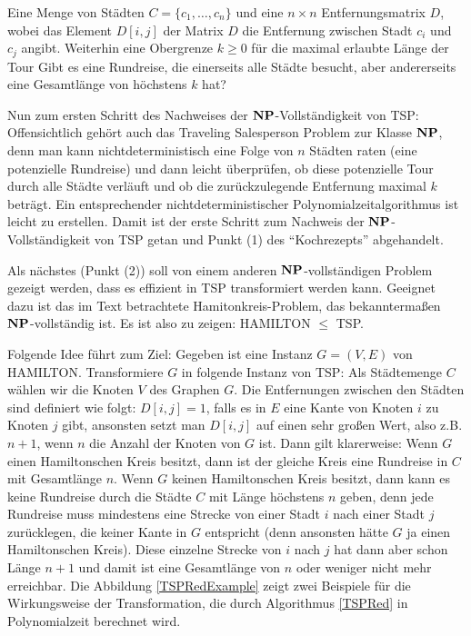 %
{Eine Menge von Städten $C = \{c_1, \dots ,c_n \}$ und eine $n \times
  n$ Entfernungsmatrix $D$, wobei das Element $D[i,j]$ der Matrix $D$
  die Entfernung zwischen Stadt $c_i$ und $c_j$ angibt. Weiterhin eine
  Obergrenze $k \ge 0$ für die maximal erlaubte Länge der Tour}%
{Gibt es eine Rundreise, die einerseits alle Städte besucht, aber
  andererseits eine Gesamtlänge von höchstens $k$ hat?}

Nun zum ersten Schritt des Nachweises der $\mathbf{N}\mathbf{P}$-Vollständigkeit von
\textsf{TSP}: Offensichtlich gehört auch das Traveling Salesperson Problem zur
Klasse $\mathbf{N}\mathbf{P}$, denn man kann nichtdeterministisch eine Folge von $n$
Städten raten (eine potenzielle Rundreise) und dann leicht überprüfen,
ob diese potenzielle Tour durch alle Städte verläuft und ob die
zurückzulegende Entfernung maximal $k$ beträgt. Ein entsprechender
nichtdeterministischer Polynomialzeitalgorithmus ist leicht zu
erstellen. Damit ist der erste Schritt zum Nachweis der
$\mathbf{N}\mathbf{P}$-Vollständigkeit von \textsf{TSP} getan und Punkt (1) des
"`Kochrezepts"' abgehandelt.

Als nächstes (Punkt (2)) soll von einem anderen $\mathbf{N}\mathbf{P}$-vollständigen
Problem gezeigt werden, dass es effizient in \textsf{TSP}
transformiert werden kann. Geeignet dazu ist das im Text betrachtete
Hamitonkreis-Problem, das bekanntermaßen $\mathbf{N}\mathbf{P}$-vollständig ist. Es
ist also zu zeigen: \textsf{HAMILTON} $\le$ \textsf{TSP}.

Folgende Idee führt zum Ziel: Gegeben ist eine Instanz $G=(V,E)$ von
\textsf{HAMILTON}. Transformiere $G$ in folgende Instanz von \textsf{TSP}: Als
Städtemenge $C$ wählen wir die Knoten $V$ des Graphen $G$. Die
Entfernungen zwischen den Städten sind definiert wie folgt:
$D[i,j]=1$, falls es in $E$ eine Kante von Knoten $i$ zu Knoten $j$
gibt, ansonsten setzt man $D[i,j]$ auf einen sehr großen Wert, also
z.B. $n+1$, wenn $n$ die Anzahl der Knoten von $G$ ist. Dann gilt
klarerweise: Wenn $G$ einen Hamiltonschen Kreis besitzt, dann ist der
gleiche Kreis eine Rundreise in $C$ mit Gesamtlänge $n$.  Wenn $G$
keinen Hamiltonschen Kreis besitzt, dann kann es keine Rundreise durch
die Städte $C$ mit Länge höchstens $n$ geben, denn jede Rundreise muss
mindestens eine Strecke von einer Stadt $i$ nach einer Stadt $j$
zurücklegen, die keiner Kante in $G$ entspricht (denn ansonsten hätte
$G$ ja einen Hamiltonschen Kreis). Diese einzelne Strecke von $i$ nach
$j$ hat dann aber schon Länge $n+1$ und damit ist eine Gesamtlänge von
$n$ oder weniger nicht mehr erreichbar. Die Abbildung \ref{TSPRedExample} 
zeigt zwei Beispiele für die Wirkungsweise der Transformation, die
durch Algorithmus \ref{TSPRed} in Polynomialzeit berechnet wird.

